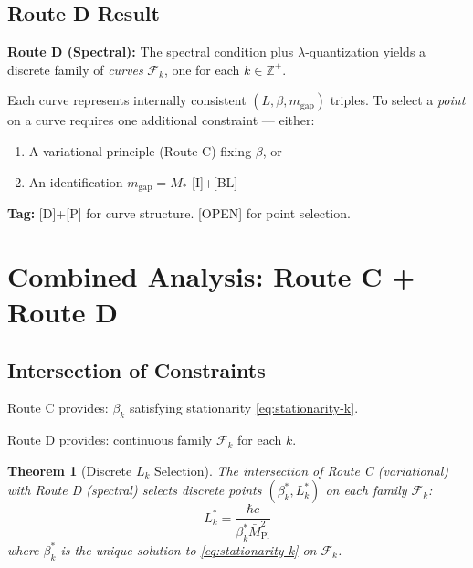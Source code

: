 \documentclass[11pt,a4paper]{article}
\newtheorem{theorem}{Theorem}[section]
\begin{document}
\subsection{Route D Result}

\begin{resultbox}
\textbf{Route D (Spectral):} The spectral condition plus $\lambda$-quantization
yields a discrete family of \emph{curves} $\mathcal{F}_k$, one for each $k \in \mathbb{Z}^+$.

Each curve represents internally consistent $(L, \beta, m_{\text{gap}})$ triples.
To select a \emph{point} on a curve requires one additional constraint — either:
\begin{enumerate}
  \item A variational principle (Route C) fixing $\beta$, or
  \item An identification $m_{\text{gap}} = M_*$ [I]+[BL]
\end{enumerate}

\textbf{Tag:} [D]+[P] for curve structure. [OPEN] for point selection.
\end{resultbox}

\section{Combined Analysis: Route C + Route D}
\label{sec:combined}

\subsection{Intersection of Constraints}

Route C provides: $\beta_k$ satisfying stationarity \eqref{eq:stationarity-k}.

Route D provides: continuous family $\mathcal{F}_k$ for each $k$.

\begin{theorem}[Discrete $L_k$ Selection]
\label{thm:discrete-selection}
The intersection of Route C (variational) with Route D (spectral) selects
discrete points $(\beta_k^*, L_k^*)$ on each family $\mathcal{F}_k$:
\begin{equation}
  L_k^* = \frac{\hbar c}{\beta_k^* \bar{M}_{\text{Pl}}^2}
  \label{eq:Lk-star}
\end{equation}
where $\beta_k^*$ is the unique solution to \eqref{eq:stationarity-k} on
$\mathcal{F}_k$.
\end{theorem}
\end{document}
